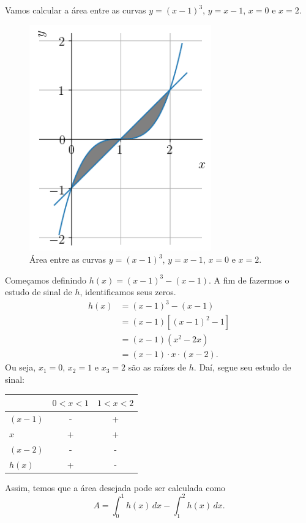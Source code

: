\begin{ex}\label{ex:apint_areacurvas}
  Vamos calcular a área entre as curvas $y = (x-1)^3$, $y = x-1$, $x=0$ e $x=2$.

  \begin{figure}[H]
    \centering
    \includegraphics[width=0.7\textwidth]{./cap_apint/dados/fig_ex_apint_areacurvas/fig}
    \caption{Área entre as curvas $y = (x-1)^3$, $y = x-1$, $x=0$ e $x=2$.}
    \label{fig:ex_apint_areacurvas}
  \end{figure}  

  Começamos definindo $h(x) = (x-1)^3 - (x-1)$. A fim de fazermos o estudo de sinal de $h$, identificamos seus zeros.
  \begin{align}
    h(x) &= (x-1)^3-(x-1) \\
         &= (x-1)\left[(x-1)^2-1\right] \\
         &= (x-1)(x^2-2x) \\
         &= (x-1)\cdot x\cdot (x-2).
  \end{align}
  Ou seja, $x_1=0$, $x_2=1$ e $x_3=2$ são as raízes de $h$. Daí, segue seu estudo de sinal:
  \begin{center}
    \begin{tabular}{l|c|c}
              & $0<x<1$ & $1<x<2$ \\\hline
      $(x-1)$ &   -     &    +    \\
      $x$     &   +     &    +    \\
      $(x-2)$ &   -     &    -    \\\hline
      $h(x)$  &   +     &    -    \\\hline
    \end{tabular}
  \end{center}
  Assim, temos que a área desejada pode ser calculada como
  \begin{equation}
    A = \int_0^1 h(x)\,dx - \int_1^2 h(x)\,dx.
  \end{equation}


\end{ex}
